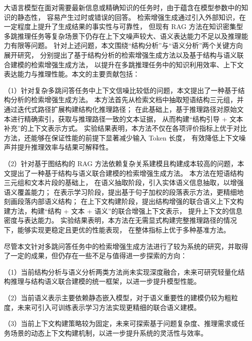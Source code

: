 
\begin{conclusions}

大语言模型在面对需要最新信息或精确知识的任务时，由于蕴含在模型参数中的知识的静态性，
容易产生过时或错误的回答。
检索增强生成通过引入外部知识，在一定程度上提升了生成结果的事实性与可靠性，
但现有 RAG 方法在知识密集型多跳推理任务等复杂场景下仍存在上下文噪声较大、语义表达能力不足以及推理能力有限等问题。
针对上述问题，本文围绕“结构分析”与“语义分析”两个关键方向展开研究，
分别提出了基于结构分析的检索增强生成方法以及基于结构与语义联合建模的检索增强生成方法，
以提升在多跳推理任务中的知识利用效率、上下文表达能力与推理性能。本文的主要贡献包括：

（1）针对复杂多跳问答任务中上下文信噪比较低的问题，本文提出了一种基于结构分析的检索增强生成方法。
本方法首先从检索文档中抽取短语结构三元组，并通过迭代式路径扩展构建结构化推理路径；
在此基础上，基于推理路径对原始文本进行精确索引，获取与推理路径一致的文本证据，
从而构建“结构引导 + 文本补充”的上下文表示方式。
实验结果表明，本方法不仅在各项评价指标上优于对比方法，还能够在保证性能的前提下显著减少输入 Token 长度，
有效降低上下文噪声并提升推理效率与结果可解释性。

（2）针对基于图结构的 RAG 方法依赖复杂关系建模且构建成本较高的问题，本文提出了一种基于结构与语义联合建模的检索增强生成方法。
本方法在短语结构三元组和文本片段的基础上，
在语义抽取阶段，引入实体语义信息抽取，以增强语义覆盖能力；
在表示学习阶段，提出基于句子加权的段落表示方法，更精细地刻画段落内部语义结构；
在上下文构建阶段，提出结构增强的联合语义上下文构建方法，构建“结构 + 文本 + 语义”的联合增强上下文表示，
提升上下文的信息密度与表达能力。
实验结果表明，本方法在无需显式构建完整推理路径的情况下，能够实现更稳定且更优的性能表现，
在整体指标上优于多种基准方法。

尽管本文针对多跳问答任务中的检索增强生成方法进行了较为系统的研究，并取得了一定的成果，但仍存在一些不足与值得进一步探索的方向：

（1）当前结构分析与语义分析两类方法尚未实现深度融合，未来可研究轻量化结构推理与结构语义联合建模的统一框架，以进一步提升模型性能。

（2）当前语义表示主要依赖静态嵌入模型，对于语义重要性的建模仍较为粗粒度，未来可引入可训练表示学习方法实现更精细的联合语义建模。

（3）当前上下文构建策略较为固定，未来可探索基于问题复杂度、推理需求或任务场景的动态上下文构建机制，以进一步提升系统的灵活性与效率。




\end{conclusions}
